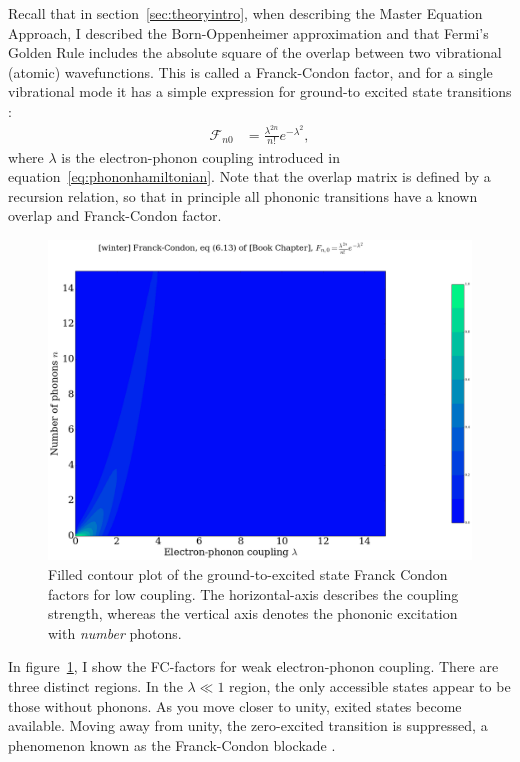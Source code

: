 Recall that in section~\ref{sec:theoryintro}, when describing the Master Equation Approach, I described the Born-Oppenheimer approximation and that Fermi's Golden Rule includes the absolute square of the overlap between two vibrational (atomic) wavefunctions. This is called a Franck-Condon factor, and for a single vibrational mode it has a simple expression for ground-to excited state transitions \cite{kaspermothpoulsen}:
\begin{align}
\mathscr{F}_{n0} &= \frac{\lambda^{2n}}{n!} e^{-\lambda^2},
\label{eq:fcfactor}
\end{align}
where $\lambda$ is the electron-phonon coupling introduced in equation~\ref{eq:phononhamiltonian}.  Note that the overlap matrix is defined by a recursion relation, so that in principle all phononic transitions have a known overlap and Franck-Condon factor.

\begin{figure}[!bp]
    \centering
    \includegraphics[height=.3\textheight]{png/fcfig.png}
    \caption{Filled contour plot of the ground-to-excited state Franck Condon factors for low coupling. The horizontal-axis describes the coupling strength, whereas the vertical axis denotes the phononic excitation with \emph{number} photons.}
    \label{fig:fc}
\end{figure}

In figure~\ref{fig:fc}, I show the FC-factors for weak electron-phonon coupling. There are three distinct regions. In the $\lambda\ll 1$ region, the only accessible states appear to be those without phonons. As you move closer to unity, exited states become available. Moving away from unity, the zero-excited transition is suppressed, a phenomenon known as the Franck-Condon blockade \cite{fcblockade}.

